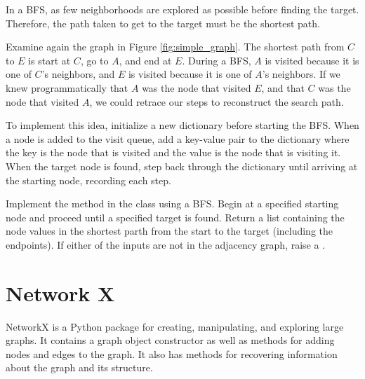 In a BFS, as few neighborhoods are explored as possible before finding the target.
Therefore, the path taken to get to the target must be the shortest path.

Examine again the graph in Figure \ref{fig:simple_graph}.
The shortest path from $C$ to $E$ is start at $C$, go to $A$, and end at $E$.
During a BFS, $A$ is visited because it is one of $C$'s neighbors, and $E$ is visited because it is one of $A$'s neighbors.
If we knew programmatically that $A$ was the node that visited $E$, and that $C$ was the node that visited $A$, we could retrace our steps to reconstruct the search path.

To implement this idea, initialize a new dictionary before starting the BFS.
When a node is added to the visit queue, add a key-value pair to the dictionary where the key is the node that is visited and the value is the node that is visiting it.
When the target node is found, step back through the dictionary until arriving at the starting node, recording each step.

\begin{problem}
Implement the  method in the  class using a BFS.
Begin at a specified starting node and proceed until a specified target is found.
Return a list containing the node values in the shortest parth from the start to the target (including the endpoints).
If either of the inputs are not in the adjacency graph, raise a .
\end{problem}

\section*{Network X}

NetworkX is a Python package for creating, manipulating, and exploring large graphs.
It contains a graph object constructor as well as methods for adding nodes and edges to the graph.
It also has methods for recovering information about the graph and its structure.

